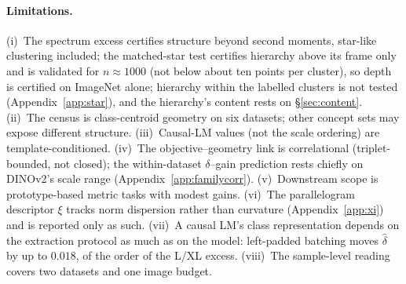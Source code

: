 \paragraph{Limitations.} (i)~The spectrum excess certifies structure beyond second moments, star-like clustering included; the matched-star test certifies hierarchy above its frame only and is validated for $n\approx1000$ (not below about ten points per cluster), so depth is certified on ImageNet alone; hierarchy within the labelled clusters is not tested (Appendix~\ref{app:star}), and the hierarchy's content rests on \S\ref{sec:content}. (ii)~The census is class-centroid geometry on six datasets; other concept sets may expose different structure. (iii)~Causal-LM values (not the scale ordering) are template-conditioned. (iv)~The objective--geometry link is correlational (triplet-bounded, not closed); the within-dataset $\delta$--gain prediction rests chiefly on DINOv2's scale range (Appendix~\ref{app:familycorr}). (v)~Downstream scope is prototype-based metric tasks with modest gains. (vi)~The parallelogram descriptor $\xi$ tracks norm dispersion rather than curvature (Appendix~\ref{app:xi}) and is reported only as such. (vii)~A causal LM's class representation depends on the extraction protocol as much as on the model: left-padded batching moves $\hat\delta$ by up to $0.018$, of the order of the L/XL excess. (viii)~The sample-level reading covers two datasets and one image budget.

